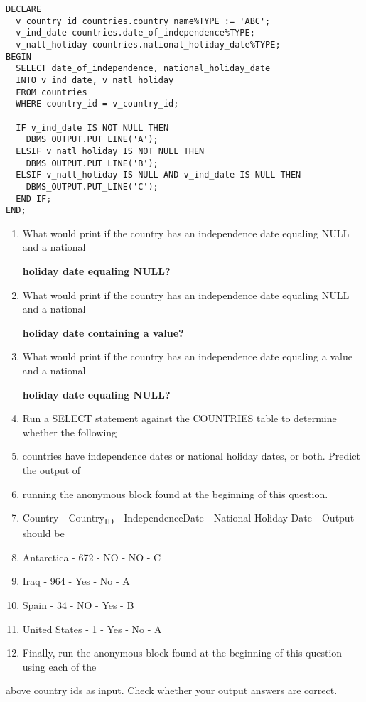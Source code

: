\documentclass[11pt]{article}
\begin{document}
\begin{verbatim}
DECLARE
  v_country_id countries.country_name%TYPE := 'ABC';
  v_ind_date countries.date_of_independence%TYPE;
  v_natl_holiday countries.national_holiday_date%TYPE;
BEGIN
  SELECT date_of_independence, national_holiday_date
  INTO v_ind_date, v_natl_holiday
  FROM countries
  WHERE country_id = v_country_id;

  IF v_ind_date IS NOT NULL THEN
    DBMS_OUTPUT.PUT_LINE('A');
  ELSIF v_natl_holiday IS NOT NULL THEN
    DBMS_OUTPUT.PUT_LINE('B');
  ELSIF v_natl_holiday IS NULL AND v_ind_date IS NULL THEN
    DBMS_OUTPUT.PUT_LINE('C');
  END IF;
END;
\end{verbatim}

\begin{enumerate}
\item What would print if the country has an independence date equaling NULL and a national

\textbf{holiday date equaling NULL?}

\item What would print if the country has an independence date equaling NULL and a national

\textbf{holiday date containing a value?}

\item What would print if the country has an independence date equaling a value and a national

\textbf{holiday date equaling NULL?}

\item Run a SELECT statement against the COUNTRIES table to determine whether the following

\item countries have independence dates or national holiday dates, or both. Predict the output of
\item running the anonymous block found at the beginning of this question.
\item Country - Country\textsubscript{ID} - IndependenceDate - National Holiday Date - Output should be
\item Antarctica - 672 - NO - NO - C
\item Iraq - 964 - Yes - No - A
\item Spain - 34 - NO - Yes - B
\item United States - 1 - Yes - No - A

\item Finally, run the anonymous block found at the beginning of this question using each of the
\end{enumerate}
above country ids as input. Check whether your output answers are correct.
\end{document}
